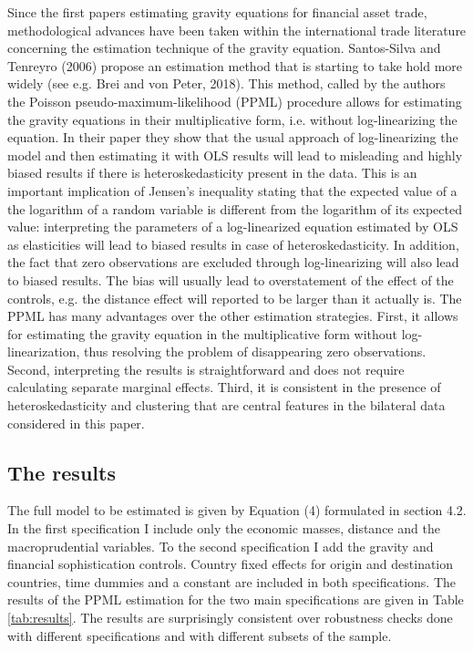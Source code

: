 \documentclass[12pt,a4paper]{article}
\begin{document}
Since the first papers estimating gravity equations for financial asset trade, methodological advances have been taken within the international trade literature concerning the estimation technique of the gravity equation. Santos-Silva and Tenreyro (2006) propose an estimation method that is starting to take hold more widely (see e.g. Brei and von Peter, 2018). This method, called by the authors the Poisson pseudo-maximum-likelihood (PPML) procedure allows for estimating the gravity equations in their multiplicative form, i.e. without log-linearizing the equation. In their paper they show that the usual approach of log-linearizing the model and then estimating it with OLS results will lead to misleading and highly biased results if there is heteroskedasticity present in the data. This is an important implication of Jensen's inequality stating that the expected value of a the logarithm of a random variable is different from the logarithm of its expected value: interpreting the parameters of a log-linearized equation estimated by OLS as elasticities will lead to biased results in case of heteroskedasticity. In addition, the fact that zero observations are excluded through log-linearizing will also lead to biased results. The bias will usually lead to overstatement of the effect of the controls, e.g. the distance effect will reported to be larger than it actually is. The PPML has many advantages over the other estimation strategies. First, it allows for estimating the gravity equation in the multiplicative form without log-linearization, thus resolving the problem of disappearing zero observations. Second, interpreting the results is straightforward and does not require calculating separate marginal effects. Third, it is consistent in the presence of heteroskedasticity and clustering that are central features in the bilateral data considered in this paper. 

\subsection{The results}

The full model to be estimated is given by Equation (4) formulated in section 4.2. In the first specification I include only the economic masses, distance and the macroprudential variables. To the second specification I add the gravity and financial sophistication controls. Country fixed effects for origin and destination countries, time dummies and a constant are included in both specifications. The results of the PPML estimation for the two main specifications are given in Table \ref{tab:results}. The results are surprisingly consistent over robustness checks done with different specifications and with different subsets of the sample.
\end{document}
